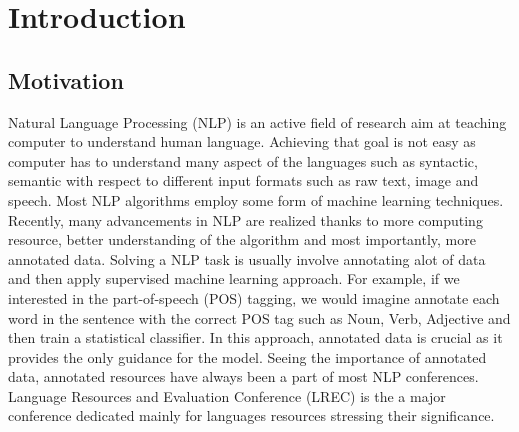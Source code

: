 \documentclass[12pt,twoside,final,hidelinks]{ltthesis}
\theoremstyle{definition}
\begin{document}


\hsp




\chapter{Introduction}
\label{chap:introduction}
\section{Motivation} 
Natural Language Processing (NLP) is an active field of research aim at teaching computer to understand human language. Achieving that goal is not easy as computer has to understand many aspect of the languages such as syntactic, semantic with respect to different input formats such as raw text, image and speech. Most NLP algorithms employ some form of machine learning techniques. Recently, many advancements in NLP are realized thanks to more computing resource, better understanding of the algorithm and most importantly, more annotated data. Solving a NLP task is usually involve annotating alot of data and then apply supervised machine learning approach. For example, if we interested in the part-of-speech (POS) tagging, we would imagine annotate each word in the sentence with the correct POS tag such as Noun, Verb, Adjective and then train a statistical classifier. In this approach, annotated data is crucial as it provides the only guidance for the model. Seeing the importance of annotated data, annotated resources have always been a part of most NLP conferences. Language Resources and Evaluation Conference (LREC) is the a major conference dedicated mainly for languages resources stressing their significance. 
\end{document}
